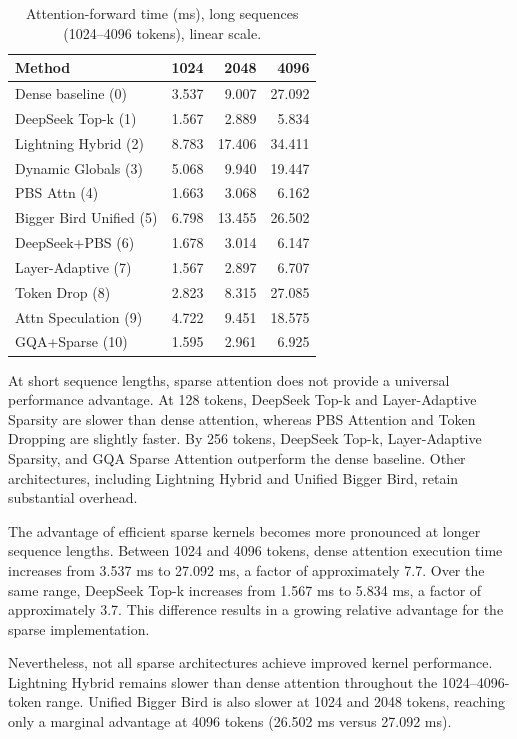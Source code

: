 \documentclass[11pt]{article}
\begin{document}
\begin{table}[ht]
  \centering
  \small
  \caption{Attention-forward time (ms), long sequences (1024--4096 tokens),
  linear scale.}
  \label{tab:long}
  \begin{tabular}{@{}lrrr@{}}
    \toprule
    Method & 1024 & 2048 & 4096 \\
    \midrule
    Dense baseline (0)        & 3.537 & 9.007  & 27.092 \\
    DeepSeek Top-k (1)        & 1.567 & 2.889  & 5.834 \\
    Lightning Hybrid (2)      & 8.783 & 17.406 & 34.411 \\
    Dynamic Globals (3)       & 5.068 & 9.940  & 19.447 \\
    PBS Attn (4)              & 1.663 & 3.068  & 6.162 \\
    Bigger Bird Unified (5)   & 6.798 & 13.455 & 26.502 \\
    DeepSeek+PBS (6)          & 1.678 & 3.014  & 6.147 \\
    Layer-Adaptive (7)        & 1.567 & 2.897  & 6.707 \\
    Token Drop (8)            & 2.823 & 8.315  & 27.085 \\
    Attn Speculation (9)      & 4.722 & 9.451  & 18.575 \\
    GQA+Sparse (10)           & 1.595 & 2.961  & 6.925 \\
    \bottomrule
  \end{tabular}
\end{table}


At short sequence lengths, sparse attention does not provide a universal performance advantage. At 128 tokens, DeepSeek Top-k and Layer-Adaptive Sparsity are slower than dense attention, whereas PBS Attention and Token Dropping are slightly faster. By 256 tokens, DeepSeek Top-k, Layer-Adaptive Sparsity, and GQA Sparse Attention outperform the dense baseline. Other architectures, including Lightning Hybrid and Unified Bigger Bird, retain substantial overhead.

The advantage of efficient sparse kernels becomes more pronounced at longer sequence lengths. Between 1024 and 4096 tokens, dense attention execution time increases from 3.537 ms to 27.092 ms, a factor of approximately 7.7. Over the same range, DeepSeek Top-k increases from 1.567 ms to 5.834 ms, a factor of approximately 3.7. This difference results in a growing relative advantage for the sparse implementation.

Nevertheless, not all sparse architectures achieve improved kernel performance. Lightning Hybrid remains slower than dense attention throughout the 1024--4096-token range. Unified Bigger Bird is also slower at 1024 and 2048 tokens, reaching only a marginal advantage at 4096 tokens (26.502 ms versus 27.092 ms).
\end{document}
